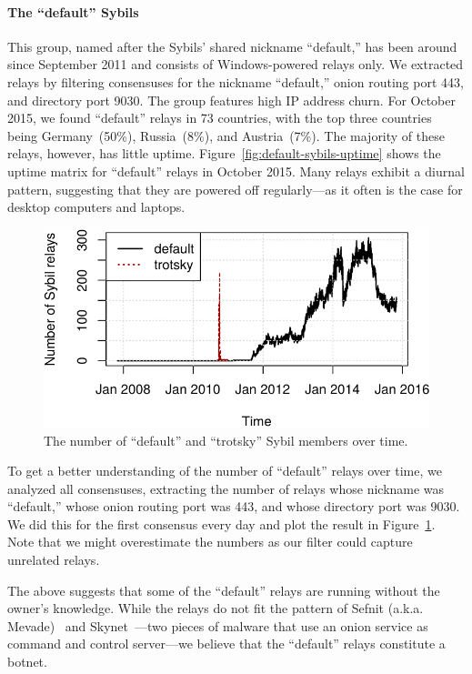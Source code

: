\paragraph{The ``default'' Sybils}
This group, named after the Sybils' shared nickname ``default,'' has been around
since September 2011 and consists of Windows-powered relays only.  We extracted
relays by filtering consensuses for the nickname ``default,'' onion routing port
443, and directory port 9030.  The group features high IP address churn.  For
October 2015, we found ``default'' relays in 73 countries, with the top three
countries being Germany~(50\%), Russia~(8\%), and Austria~(7\%).  The majority
of these relays, however, has little uptime.
Figure~\ref{fig:default-sybils-uptime} shows the uptime matrix for ``default''
relays in October 2015.  Many relays exhibit a diurnal pattern, suggesting that
they are powered off regularly---as it often is the case for desktop computers
and laptops.

\begin{figure}[t]
	\centering
	\includegraphics[width=\linewidth]{diagrams/default-over-time}
	\caption{The number of ``default'' and ``trotsky'' Sybil members over time.}
	\label{fig:default-over-time}
\end{figure}

To get a better understanding of the number of ``default'' relays over time, we
analyzed all consensuses, extracting the number of relays whose nickname was
``default,'' whose onion routing port was 443, and whose directory port was
9030.  We did this for the first consensus every day and plot the result in
Figure~\ref{fig:default-over-time}.  Note that we might overestimate the numbers
as our filter could capture unrelated relays.

The above suggests that some of the ``default'' relays are running without the
owner's knowledge.  While the relays do not fit the pattern of Sefnit (a.k.a.
Mevade)~\cite{sefnit} and Skynet~\cite{skynet}---two pieces of malware that use
an onion service as command and control server---we believe that the ``default''
relays constitute a botnet.

